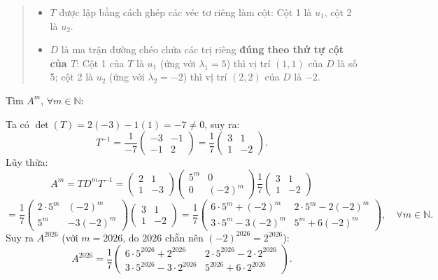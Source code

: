 \documentclass[12pt,a4paper]{article}
\newcommand{\N}{\mathbb{N}}
\begin{document}
\begin{quote}
\small
\noindent{}\par\vspace{3pt}
\begin{itemize}[noitemsep,topsep=2pt]
\item $T$ được lập bằng cách ghép các véc tơ riêng làm cột: Cột 1 là $u_1$, cột 2 là $u_2$.
\item $D$ là ma trận đường chéo chứa các trị riêng \textbf{đúng theo thứ tự cột của $T$}: Cột 1 của $T$ là $u_1$ (ứng với $\lambda_1 = 5$) thì vị trí $(1, 1)$ của $D$ là số 5; cột 2 là $u_2$ (ứng với $\lambda_2 = -2$) thì vị trí $(2, 2)$ của $D$ là $-2$.
\end{itemize}
\end{quote}

\vspace{0.2cm}
Tìm $A^m$, $\forall m \in \N$:

Ta có $\det(T) = 2(-3) - 1(1) = -7 \neq 0$, suy ra:
\[
T^{-1} = \frac{1}{-7}\begin{pmatrix} -3 & -1 \\ -1 & 2 \end{pmatrix} = \frac{1}{7}\begin{pmatrix} 3 & 1 \\ 1 & -2 \end{pmatrix}.
\]
Lũy thừa:
\[
A^m = T D^m T^{-1} = \begin{pmatrix} 2 & 1 \\ 1 & -3 \end{pmatrix} \begin{pmatrix} 5^m & 0 \\ 0 & (-2)^m \end{pmatrix} \frac{1}{7}\begin{pmatrix} 3 & 1 \\ 1 & -2 \end{pmatrix}
\]
\[
= \frac{1}{7} \begin{pmatrix} 2\cdot 5^m & (-2)^m \\ 5^m & -3(-2)^m \end{pmatrix} \begin{pmatrix} 3 & 1 \\ 1 & -2 \end{pmatrix} 
= \frac{1}{7} \begin{pmatrix} 6\cdot 5^m + (-2)^m & 2\cdot 5^m - 2(-2)^m \\ 3\cdot 5^m - 3(-2)^m & 5^m + 6(-2)^m \end{pmatrix}, \quad \forall m \in \N.
\]
Suy ra $A^{2026}$ (với $m = 2026$, do $2026$ chẵn nên $(-2)^{2026} = 2^{2026}$):
\[
A^{2026} = \frac{1}{7} \begin{pmatrix} 6\cdot 5^{2026} + 2^{2026} & 2\cdot 5^{2026} - 2\cdot 2^{2026} \\ 3\cdot 5^{2026} - 3\cdot 2^{2026} & 5^{2026} + 6\cdot 2^{2026} \end{pmatrix}.
\]
\end{document}
